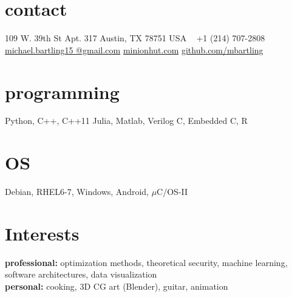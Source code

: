\documentclass[]{friggeri-cv} %
\begin{document}

\begin{aside} %
\section{contact}
109 W. 39th St
Apt. 317
Austin, TX 78751
USA
~
+1 (214) 707-2808
~
\href{mailto:michael.bartling15@gmail.com}{michael.bartling15
@gmail.com}
\href{http://www.minionhut.com}{minionhut.com}
\href{http://github.com/mbartling}{github.com/mbartling}
\section{programming}
{%
Python, C++, C++11
Julia, Matlab, Verilog
C, Embedded C, R}
\section{OS}
Debian, RHEL6-7,
Windows, Android,
$\mu$C/OS-II
\end{aside}

\section{Interests}

\textbf{professional:} optimization methods, theoretical security, machine learning, software architectures, data visualization \\ \textbf{personal:} cooking, 3D CG art (Blender), guitar, animation 
\end{document}
